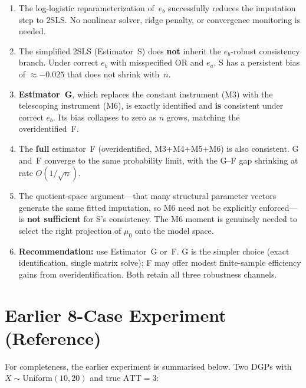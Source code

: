 \documentclass[11pt,letterpaper]{article}
\newcommand{\ATT}{\mathrm{ATT}}
\begin{document}
\begin{enumerate}
  \item The log-logistic reparameterization of~$e_b$ successfully
    reduces the imputation step to 2SLS.  No nonlinear solver,
    ridge penalty, or convergence monitoring is needed.

  \item The simplified 2SLS (Estimator~S) does \textbf{not}
    inherit the $e_b$-robust consistency branch.  Under correct $e_b$
    with misspecified OR and $e_a$, S has a persistent bias of
    ${\approx}{-0.025}$ that does not shrink with~$n$.

  \item \textbf{Estimator~G}, which replaces the constant instrument
    (M3) with the telescoping instrument (M6), is exactly identified
    and \textbf{is} consistent under correct $e_b$.  Its bias
    collapses to zero as $n$ grows, matching the overidentified~F.

  \item The \textbf{full} estimator~F (overidentified, M3+M4+M5+M6)
    is also consistent.  G and~F converge to the same probability
    limit, with the G--F gap shrinking at rate $O(1/\sqrt{n})$.

  \item The quotient-space argument---that many structural parameter
    vectors generate the same fitted imputation, so M6 need not be
    explicitly enforced---is \textbf{not sufficient} for S's consistency.
    The M6 moment is genuinely needed to select the right projection
    of $\mu_0$ onto the model space.

  \item \textbf{Recommendation:} use Estimator~G or~F.  G is the
    simpler choice (exact identification, single matrix solve);
    F may offer modest finite-sample efficiency gains from
    overidentification.  Both retain all three robustness channels.
\end{enumerate}


\appendix
\section{Earlier 8-Case Experiment (Reference)}
\label{app:eight-case}

For completeness, the earlier experiment is summarised below.  Two DGPs
with $X \sim \mathrm{Uniform}(10,20)$ and true $\ATT = 3$:
\end{document}
